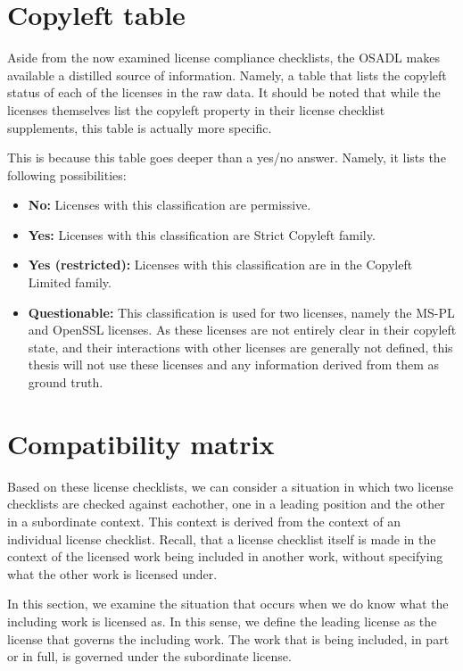 \section{Copyleft table}

Aside from the now examined license compliance checklists, the OSADL makes available a distilled source of information. Namely, a table that lists the copyleft status of each of the licenses in the raw data. It should be noted that while the licenses themselves list the copyleft property in their license checklist supplements, this table is actually more specific.

This is because this table goes deeper than a yes/no answer. Namely, it lists the following possibilities:

\begin{itemize}
	\item \textbf{No:} Licenses with this classification are permissive.
	\item \textbf{Yes:} Licenses with this classification are Strict Copyleft family.
	\item \textbf{Yes (restricted):} Licenses with this classification are in the Copyleft Limited family.
	\item \textbf{Questionable:} This classification is used for two licenses, namely the MS-PL and OpenSSL licenses. As these licenses are not entirely clear in their copyleft state, and their interactions with other licenses are generally not defined, this thesis will not use these licenses and any information derived from them as ground truth.
	
\end{itemize}

\section{Compatibility matrix}

Based on these license checklists, we can consider a situation in which two license checklists are checked against eachother, one in a leading position and the other in a subordinate context. This context is derived from the context of an individual license checklist. Recall, that a license checklist itself is made in the context of the licensed work being included in another work, without specifying what the other work is licensed under.

In this section, we examine the situation that occurs when we do know what the including work is licensed as. In this sense, we define the leading license as the license that governs the including work. The work that is being included, in part or in full, is governed under the subordinate license. \\

